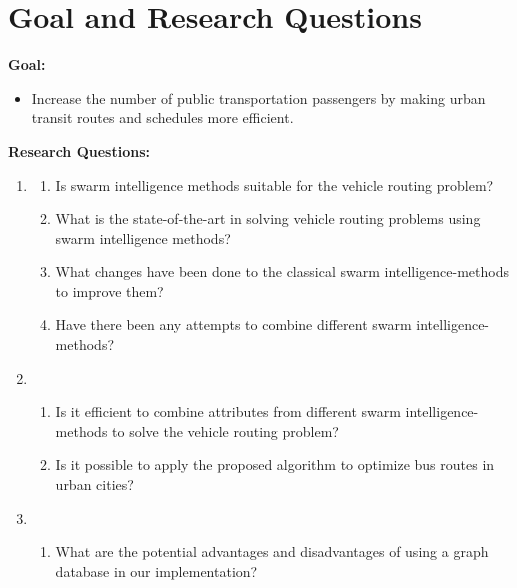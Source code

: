 \section{Goal and Research Questions}
\textbf{Goal:}
\begin{itemize}
\item \label{itm:goal} Increase the number of public transportation passengers by making urban transit routes and schedules more efficient.
\end{itemize}
\textbf{Research Questions:}
\begin{enumerate}[label=\textbf{\arabic*})]
\item \label{itm:1}
    \begin{enumerate}
    \item \label{itm:1a} Is swarm intelligence methods suitable for the vehicle routing problem?
    \item \label{itm:1b} What is the state-of-the-art in solving vehicle routing problems using swarm intelligence methods?
    \item \label{itm:1c} What changes have been done to the classical swarm intelligence-methods to improve them?
    \item \label{itm:1d} Have there been any attempts to combine different swarm intelligence-methods?
	\end{enumerate}
\item
    \begin{enumerate}
    \item \label{itm:2a} Is it efficient to combine attributes from different swarm intelligence-methods to solve the vehicle routing problem?
    \item \label{itm:2b} Is it possible to apply the proposed algorithm to optimize bus routes in urban cities?
    \end{enumerate}

\item
	\begin{enumerate}
	\item \label{itm:3a} What are the potential advantages and disadvantages of using a graph database in our implementation?
    \end{enumerate}
\end{enumerate}